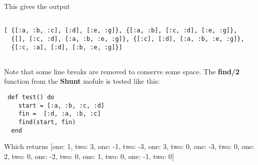 \documentclass[a4paper,11pt]{article}
\begin{document}
This gives the output 

\begin{verbatim}

[ {[:a, :b, :c], [:d], [:e, :g]}, {[:a, :b], [:c, :d], [:e, :g]},
  {[], [:c, :d], [:a, :b, :e, :g]}, {[:c], [:d], [:a, :b, :e, :g]},
  {[:c, :a], [:d], [:b, :e, :g]}]
  
\end{verbatim}
Note that some line breaks are removed to conserve some space.
The \textbf{find/2} function from the \textbf{Shunt} mofule is tested like this:
\begin{verbatim}
 def test() do
    start = [:a, :b, :c, :d]
    fin =  [:d, :a, :b, :c]
    find(start, fin)
  end
  \end{verbatim}
  Which returns
  [one: 1, two: 3, one: -1, two: -3, one: 3, two: 0, one: -3, two: 0, one: 2, two: 0, one: -2, two: 0, one: 1, two: 0, one: -1, two: 0]
	
	
	
	
	
	
	
	
	
	
	
	
	
	
\end{document}
